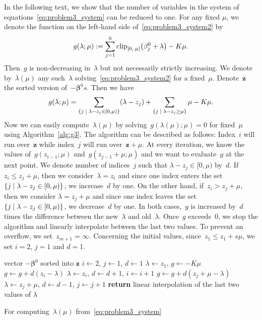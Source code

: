 In the following text, we show that the number of variables in the system of equations~\eqref{eq:problem3_system} can be reduced to one. For any fixed $\mu$, we denote the function on the left-hand side of~\eqref{eq:problem3_system2} by 
\begin{equation*}
  g(\lambda; \mu) := \sum_{j=1}^{\ntil} \clip{0}{\mu}{\beta_j^0 + \lambda} - K\mu.
\end{equation*}
Then~$g$ is non-decreasing in~$\lambda$ but not necessarily strictly increasing. We denote by~$\lambda(\mu)$ any such~$\lambda$ solving~\eqref{eq:problem3_system2} for a fixed~$\mu$. Denote~$\bm{z}$ the sorted version of~$-\bm{\beta}^0s$. Then we have
\begin{equation*}
  g(\lambda; \mu)
    = \sum_{\Set{j}{\lambda - z_j \in [0, \mu)}}(\lambda - z_j)
    + \sum_{\Set{j}{\lambda - z_j \ge \mu}}\mu - K\mu.
\end{equation*}
Now we can easily compute~$\lambda(\mu)$ by solving~$g(\lambda(\mu); \mu) = 0$ for fixed~$\mu$ using Algorithm~\ref{alg:g3}. The algorithm can  be described as follows: Index~$i$ will run over~$\bm{z}$ while index~$j$ will run over~$\bm{z} + \mu$. At every iteration, we know the values of~$g(z_{i-1}; \mu)$ and~$g(z_{j-1}+\mu; \mu)$ and we want to evaluate~$g$ at the next point. We denote number of indices~$j$ such that $\lambda - z_j \in[0, \mu)$ by~$d$. If~$z_i \le z_j + \mu$, then we consider~$\lambda = z_i$ and since one index enters the set~$\Set{j}{\lambda - z_j \in [0, \mu)}$, we increase~$d$ by one. On the other hand, if~$z_i > z_j + \mu$, then we consider $\lambda = z_j + \mu$ and since one index leaves the set~$\Set{j}{\lambda - z_j \in [0, \mu)}$, we decrease~$d$ by one. In both cases,~$g$ is increased by~$d$ times the difference between the new~$\lambda$ and old~$\lambda$. Once~$g$ exceeds~$0$, we stop the algorithm and linearly interpolate between the last two values. To prevent an overflow, we set~$z_{m+1}=\infty$. Concerning the initial values, since~$z_1 \le z_1 + s\mu$, we set $i=2$, $j=1$ and $d=1$. 

\begin{algorithm}
  \centering
  \begin{algorithmic}[1]
    \Require vector $-\bm{\beta}^0$ sorted into $\bm{z}$
    \State $i \gets 2$, $j \gets 1$, $d \gets 1$
    \State $\lambda \gets z_1$, $g \gets - K\mu$
        \State $g \gets g + d(z_i - \lambda)$
        \State $\lambda\gets z_i$, $d \gets d+1$, $i \gets i+1$
      \Else
        \State $g \gets g + d(z_j + \mu - \lambda)$
        \State $\lambda \gets z_j + \mu$, $d \gets d - 1$, $j \gets j + 1$
      \EndIf
    \EndWhile
    \State \textbf{return} linear interpolation of the last two values of $\lambda$
  \end{algorithmic}
  \caption{For computing~$\lambda(\mu)$ from~\eqref{eq:problem3_system}}
  \label{alg:g3}
\end{algorithm}

